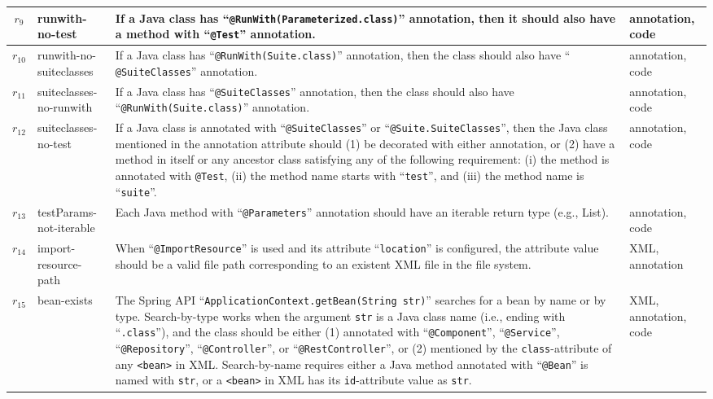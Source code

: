 \begin{table}[h]
\begin{tabular}{|c|p{1.5cm}|p{8cm}|p{1.5cm}|}
\hline
$r_{9}$ & runwith-no-test & If a Java class has ``{\tt @RunWith(Parameterized.class)}'' annotation, then it should also have a method with ``{\tt @Test}'' annotation. & annotation, code\\
\hline
$r_{10}$ & runwith-no-suiteclasses & If a Java class has ``{\tt @RunWith(Suite.class)}'' annotation, then the class should also have ``{  \tt @SuiteClasses}'' annotation. & annotation, code \\
\hline
$r_{11}$ & suiteclasses-no-runwith & If a Java class has ``{\tt @SuiteClasses}'' annotation, then the class should also have ``{\tt @RunWith(Suite.class)}'' annotation. & annotation, code \\
\hline
$r_{12}$ & suiteclasses-no-test & If a Java class is annotated with ``{\tt @SuiteClasses}'' or ``{\tt @Suite.SuiteClasses}'', then the Java class mentioned in the annotation attribute should (1) be decorated with either annotation, or (2) have a method in itself or any ancestor class satisfying any of the following requirement: (i) the method is annotated with {\tt @Test}, (ii) the method name starts with ``{\tt test}'', and (iii) the method name is ``{\tt suite}''. & annotation, code
\\
\hline
$r_{13}$ & testParams-not-iterable & Each Java method with ``{\tt  @Parameters}'' annotation should have an iterable return type (e.g., List). & annotation, code \\
\hline

$r_{14}$ & import-resource-path & When ``{\tt @ImportResource}'' is used and its attribute ``{\tt location}'' is configured, the attribute value should be a valid file path corresponding to an existent XML file in the file system. & XML, annotation \\
\hline

$r_{15}$ & bean-exists & The Spring API ``{\tt ApplicationContext.getBean(String str)}'' searches for a bean by name or by type. 
Search-by-type works when the argument {\tt str} is a Java class name (i.e., ending with ``{\tt .class}''), and the class should be either (1) annotated with ``{\tt @Component}'', ``{\tt @Service}'', ``{\tt @Repository}'', ``{\tt @Controller}'', or ``{\tt @RestController}'', or (2) mentioned by the {\tt class}-attribute of any {\tt <bean>} in XML. 
Search-by-name requires either a Java method annotated with ``{\tt @Bean}'' is named with {\tt str}, or a {\tt <bean>} in XML has its {\tt  id}-attribute value as {\tt str}.& XML, annotation, code \\
\hline
\end{tabular}
\vspace{-2.5em}
\end{table}

